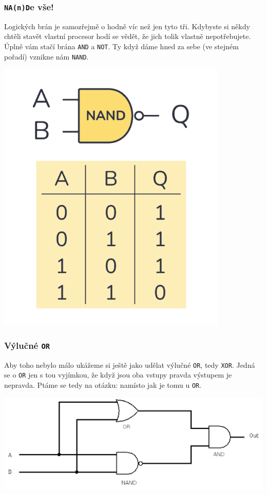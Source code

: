 \documentclass{beamer}
\begin{document}
\begin{frame}
\frametitle{\texttt{NA(n)D}e vše!}
 Logických brán je samozřejmě o hodně víc než jen tyto tři. Kdybyste si někdy
 chtěli stavět vlastní procesor hodí se vědět, že jich tolik vlastně
 nepotřebujete. Úplně vám stačí brána \texttt{AND} a \texttt{NOT}. Ty když dáme
 hned za sebe (ve stejném pořadí) vznikne nám \texttt{NAND}.

 \includegraphics[scale=0.35]{nand.png}
\end{frame}

\begin{frame}
 \frametitle{Výlučné \texttt{OR}}
 Aby toho nebylo málo ukážeme si ještě jako udělat výlučné \texttt{OR}, tedy
 \texttt{XOR}. Jedná se o \texttt{OR} jen s tou vyjímkou, že když jsou oba
 vstupy pravda výstupem je nepravda. Ptáme se tedy na otázku:  namísto  jak je
 tomu u \texttt{OR}.

 \includegraphics[width=\textwidth]{xor.png}
\end{frame}
\end{document}
